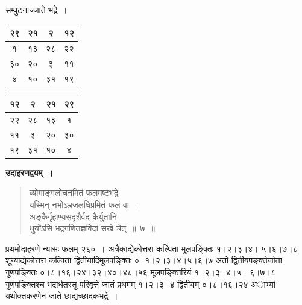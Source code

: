 \documentclass[11pt, openany]{book}
\begin{document}
\newpage

\begin{center}
	सम्पुटनाज्जाते भद्रे~। 
\end{center}

\vspace{-4mm}
\begin{table}[h]
	\centering
	\begin{tabular}{|c|c|c|c|}
		\hline
		२९& २१ & २ & १२\\
		\hline
		१ & १३ & २८ & २२\\
		\hline
		३०& २० & ३ & ११\\
		\hline
		४ & १० & ३१ & १९\\
		\hline
	\end{tabular}\qquad
	\begin{tabular}{|c|c|c|c|}
		\hline
		१२ & २ & २१ & २९\\
		\hline
		२२ & २८ & १३ & १\\
		\hline
		११ & ३ & २० & ३०\\
		\hline
		१९ & ३१ & १० & ४\\
		\hline
	\end{tabular}
\end{table}
\vspace{4mm}

\textbf{उदाहरणद्वयम्~।}

\begin{quote}
{\ex व्योमाङ्गलोचनमितं फलमष्टभद्रे\\
यस्मिन् नभोऽभ्रजलधिप्रमितं फलं वा~।\\
अङ्कैर्गृहाण्यसदृशैर्वद कैर्युतानि\\
धुर्योऽसि भद्रगणितज्ञविदां सखे चेत्~॥~७~॥}
\end{quote}

प्रथमोदाहरणे न्यासः फलम् २६०~। अत्रैकाद्येकोत्तरा कल्पिता मूलपङ्क्तिः १।२।३।४। ५।६।७।८ शून्याद्येकोत्तरा कल्पिता द्वितीयादिमूलपङ्क्तिः ०।१।२।३।४।५।६।७ अतो द्वितीयपङ्क्तेर्जाता गुणपङ्क्तिः ०।८।१६।२४।३२।४०।४८।५६ मूलपङ्क्तिरियं १।२।३।४।५। ६।७।८ गुणपङ्क्तिश्च भद्रार्धतस्तु परिवृत्ते जातं प्रथमम् १।२।३।४ द्वितीयम् ०।८।१६।२४ अाभ्यां यथोक्तकरणेन जाते छाद्यच्छादकभद्रे~।
\end{document}
